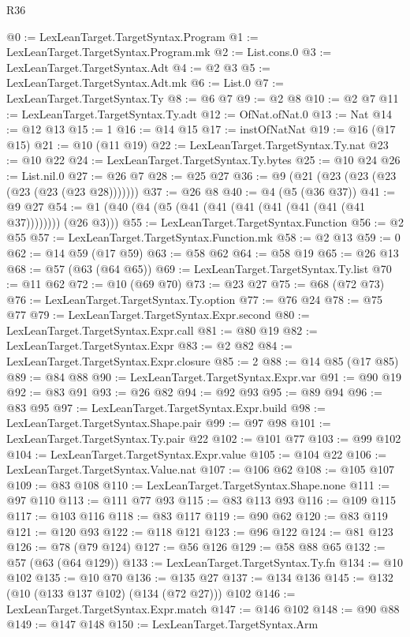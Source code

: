 \begin{lexlean}{R36}
\begin{coremodule}
@0 := LexLeanTarget.TargetSyntax.Program
@1 := LexLeanTarget.TargetSyntax.Program.mk
@2 := List.cons.{0}
@3 := LexLeanTarget.TargetSyntax.Adt
@4 := @2 @3
@5 := LexLeanTarget.TargetSyntax.Adt.mk
@6 := List.{0}
@7 := LexLeanTarget.TargetSyntax.Ty
@8 := @6 @7
@9 := @2 @8
@10 := @2 @7
@11 := LexLeanTarget.TargetSyntax.Ty.adt
@12 := OfNat.ofNat.{0}
@13 := Nat
@14 := @12 @13
@15 := 1
@16 := @14 @15
@17 := instOfNatNat
@19 := @16 (@17 @15)
@21 := @10 (@11 @19)
@22 := LexLeanTarget.TargetSyntax.Ty.nat
@23 := @10 @22
@24 := LexLeanTarget.TargetSyntax.Ty.bytes
@25 := @10 @24
@26 := List.nil.{0}
@27 := @26 @7
@28 := @25 @27
@36 := @9 (@21 (@23 (@23 (@23 (@23 (@23 (@23 @28)))))))
@37 := @26 @8
@40 := @4 (@5 (@36 @37))
@41 := @9 @27
@54 := @1 (@40 (@4 (@5 (@41 (@41 (@41 (@41 (@41 (@41 (@41 @37)))))))) (@26 @3)))
@55 := LexLeanTarget.TargetSyntax.Function
@56 := @2 @55
@57 := LexLeanTarget.TargetSyntax.Function.mk
@58 := @2 @13
@59 := 0
@62 := @14 @59 (@17 @59)
@63 := @58 @62
@64 := @58 @19
@65 := @26 @13
@68 := @57 (@63 (@64 @65))
@69 := LexLeanTarget.TargetSyntax.Ty.list
@70 := @11 @62
@72 := @10 (@69 @70)
@73 := @23 @27
@75 := @68 (@72 @73)
@76 := LexLeanTarget.TargetSyntax.Ty.option
@77 := @76 @24
@78 := @75 @77
@79 := LexLeanTarget.TargetSyntax.Expr.second
@80 := LexLeanTarget.TargetSyntax.Expr.call
@81 := @80 @19
@82 := LexLeanTarget.TargetSyntax.Expr
@83 := @2 @82
@84 := LexLeanTarget.TargetSyntax.Expr.closure
@85 := 2
@88 := @14 @85 (@17 @85)
@89 := @84 @88
@90 := LexLeanTarget.TargetSyntax.Expr.var
@91 := @90 @19
@92 := @83 @91
@93 := @26 @82
@94 := @92 @93
@95 := @89 @94
@96 := @83 @95
@97 := LexLeanTarget.TargetSyntax.Expr.build
@98 := LexLeanTarget.TargetSyntax.Shape.pair
@99 := @97 @98
@101 := LexLeanTarget.TargetSyntax.Ty.pair @22
@102 := @101 @77
@103 := @99 @102
@104 := LexLeanTarget.TargetSyntax.Expr.value
@105 := @104 @22
@106 := LexLeanTarget.TargetSyntax.Value.nat
@107 := @106 @62
@108 := @105 @107
@109 := @83 @108
@110 := LexLeanTarget.TargetSyntax.Shape.none
@111 := @97 @110
@113 := @111 @77 @93
@115 := @83 @113 @93
@116 := @109 @115
@117 := @103 @116
@118 := @83 @117
@119 := @90 @62
@120 := @83 @119
@121 := @120 @93
@122 := @118 @121
@123 := @96 @122
@124 := @81 @123
@126 := @78 (@79 @124)
@127 := @56 @126
@129 := @58 @88 @65
@132 := @57 (@63 (@64 @129))
@133 := LexLeanTarget.TargetSyntax.Ty.fn
@134 := @10 @102
@135 := @10 @70
@136 := @135 @27
@137 := @134 @136
@145 := @132 (@10 (@133 @137 @102) (@134 (@72 @27))) @102
@146 := LexLeanTarget.TargetSyntax.Expr.match
@147 := @146 @102
@148 := @90 @88
@149 := @147 @148
@150 := LexLeanTarget.TargetSyntax.Arm

\end{coremodule}
\end{lexlean}
